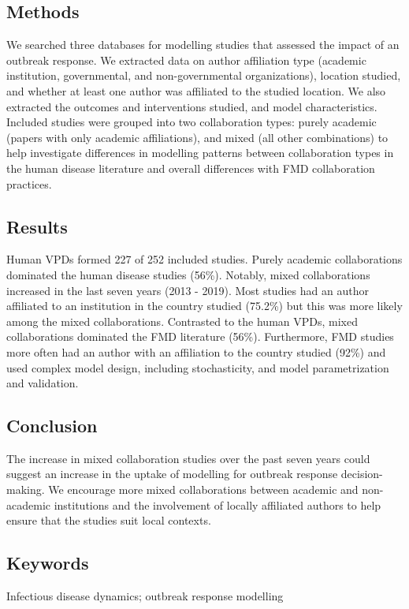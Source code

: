 \documentclass[10pt,letterpaper]{article}
\begin{document}
\subsection*{Methods}
We searched three databases for modelling studies that assessed the impact of an outbreak response. We extracted data on author affiliation type (academic institution, governmental, and non-governmental organizations), location studied, and whether at least one author was affiliated to the studied location. We also extracted the outcomes and interventions studied, and model characteristics. Included studies were grouped into two collaboration types: purely academic (papers with only academic affiliations), and mixed (all other combinations) to help investigate differences in modelling patterns between collaboration types in the human disease literature and overall differences with FMD collaboration practices. 
\subsection*{Results}
Human VPDs formed 227 of 252 included studies. Purely academic collaborations dominated the human disease studies (56\%). Notably, mixed collaborations increased in the last seven years (2013 - 2019). Most studies had an author affiliated to an institution in the country studied (75.2\%) but this was more likely among the mixed collaborations. Contrasted to the human VPDs, mixed collaborations dominated the FMD literature (56\%). Furthermore, FMD studies more often had an author with an affiliation to the country studied (92\%) and used complex model design, including stochasticity, and model parametrization and validation. 
\subsection*{Conclusion}
The increase in mixed collaboration studies over the past seven years could suggest an increase in the uptake of modelling for outbreak response decision-making. We encourage more mixed collaborations between academic and non-academic institutions and the involvement of locally affiliated authors to help ensure that the studies suit local contexts.

\subsection*{Keywords}
Infectious disease dynamics; outbreak response modelling
\end{document}
